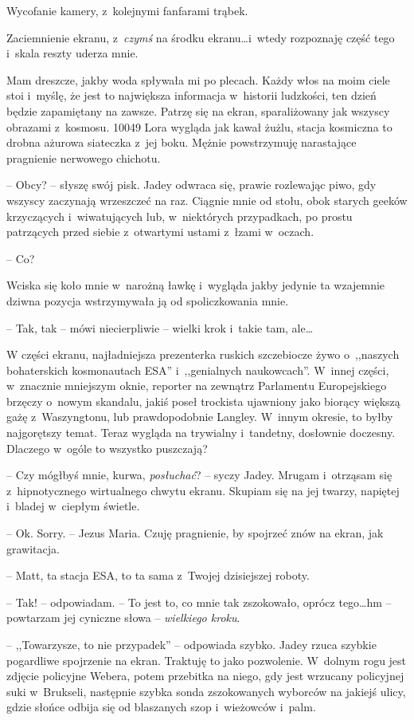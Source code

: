 \documentclass[oneside,polish,12pt,sfheadings]{mwbk}
\begin{document}
Wycofanie kamery, z~kolejnymi fanfarami trąbek.

Zaciemnienie ekranu, z~\emph{czymś } na środku ekranu\ldots i~wtedy
rozpoznaję część tego i~skala reszty uderza mnie.

Mam dreszcze, jakby woda spływała mi po plecach. Każdy włos na moim
ciele stoi i~myślę, że jest to największa informacja w~historii
ludzkości, ten dzień będzie zapamiętany na zawsze. Patrzę się na ekran,
sparaliżowany jak wszyscy obrazami z~kosmosu. 10049 Lora wygląda jak
kawał żużlu, stacja kosmiczna to drobna ażurowa siateczka z~jej boku.
Mężnie powstrzymuję narastające pragnienie nerwowego chichotu.

-- Obcy? -- słyszę swój pisk. Jadey odwraca się, prawie rozlewając piwo,
gdy wszyscy zaczynają wrzeszczeć na raz. Ciągnie mnie od stołu, obok
starych geeków krzyczących i~wiwatujących lub, w~niektórych przypadkach,
po prostu patrzących przed siebie z~otwartymi ustami z~łzami w~oczach.

-- Co?

Wciska się koło mnie w~narożną ławkę i~wygląda jakby jedynie ta
wzajemnie dziwna pozycja wstrzymywała ją od spoliczkowania mnie. 

-- Tak, tak -- mówi niecierpliwie -- wielki krok i~takie tam, ale\ldots

W części ekranu, najładniejsza prezenterka ruskich szczebiocze żywo o~,,naszych bohaterskich kosmonautach ESA'' i~,,genialnych naukowcach''. W~innej części, w~znacznie mniejszym oknie, reporter na zewnątrz
Parlamentu Europejskiego brzęczy o~nowym skandalu, jakiś poseł trockista
ujawniony jako biorący większą gażę z~Waszyngtonu, lub prawdopodobnie
Langley. W~innym okresie, to byłby najgorętszy temat. Teraz wygląda na
trywialny i~tandetny, dosłownie doczesny. Dlaczego w~ogóle to wszystko
puszczają?

-- Czy mógłbyś mnie, kurwa, \emph{posłuchać}? -- syczy Jadey. Mrugam i~otrząsam się z~hipnotycznego wirtualnego chwytu ekranu. Skupiam się na
jej twarzy, napiętej i~bladej w~ciepłym świetle.

-- Ok. Sorry. -- Jezus Maria. Czuję pragnienie, by spojrzeć znów na ekran,
jak grawitacja.

-- Matt, ta stacja ESA, to ta sama z~Twojej dzisiejszej roboty.

-- Tak! -- odpowiadam. -- To jest to, co mnie tak zszokowało, oprócz
tego\ldots hm -- powtarzam jej cyniczne słowa -- \emph{wielkiego kroku}.

-- ,,Towarzysze, to nie przypadek'' -- odpowiada szybko. Jadey rzuca szybkie
pogardliwe spojrzenie na ekran. Traktuję to jako pozwolenie. W~dolnym
rogu jest zdjęcie policyjne Webera, potem przebitka na niego, gdy jest
wrzucany policyjnej suki w~Brukseli, następnie szybka sonda zszokowanych
wyborców na jakiejś ulicy, gdzie słońce odbija się od blaszanych szop i~wieżowców i~palm.
\end{document}
